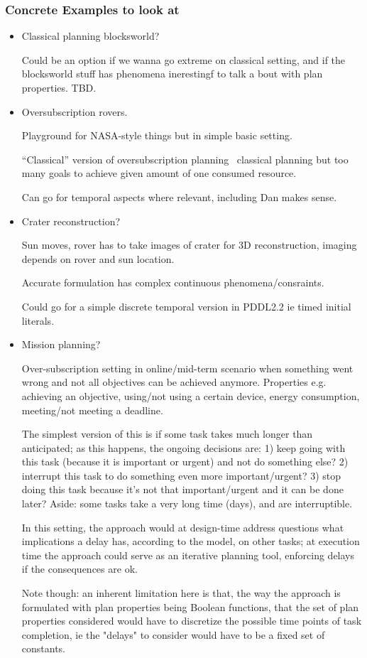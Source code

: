 \subsubsection{Concrete Examples to look at}

\begin{itemize}
\item Classical planning blocksworld?

  Could be an option if we wanna go extreme on classical setting, and
  if the blocksworld stuff has phenomena inerestingf to talk a bout
  with plan properties. TBD.

\item Oversubscription rovers.

  Playground for NASA-style things but in simple basic setting.

  ``Classical'' version of oversubscription planning \ie\ classical
  planning but too many goals to achieve given amount of one consumed
  resource.

  Can go for temporal aspects where relevant, including Dan makes
  sense.

\item Crater reconstruction?

  Sun moves, rover has to take images of crater for 3D reconstruction,
  imaging depends on rover and sun location.

  Accurate formulation has complex continuous phenomena/consraints.

  Could go for a simple discrete temporal version in PDDL2.2 ie timed
  initial literals.

\item Mission planning?

  Over-subscription setting in online/mid-term scenario when something
  went wrong and not all objectives can be achieved
  anymore. Properties e.g. achieving an objective, using/not using a
  certain device, energy consumption, meeting/not meeting a deadline.

  The simplest version of this is if some task takes much longer than
  anticipated; as this happens, the ongoing decisions are: 1) keep
  going with this task (because it is important or urgent) and not do
  something else?  2) interrupt this task to do something even more
  important/urgent?  3) stop doing this task because it's not that
  important/urgent and it can be done later? Aside: some tasks take a
  very long time (days), and are interruptible.

  In this setting, the approach would at design-time address questions
  what implications a delay has, according to the model, on other
  tasks; at execution time the approach could serve as an iterative
  planning tool, enforcing delays if the consequences are ok.

  Note though: an inherent limitation here is that, the way the
  approach is formulated with plan properties being Boolean functions,
  that the set of plan properties considered would have to discretize
  the possible time points of task completion, ie the "delays" to
  consider would have to be a fixed set of constants.

\end{itemize}
